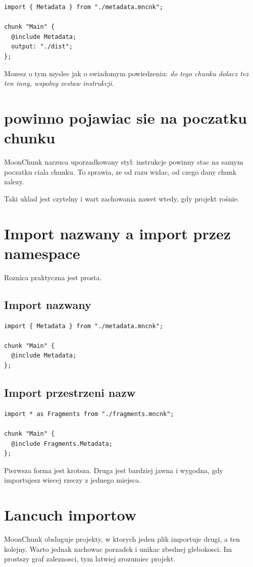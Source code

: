 \begin{lstlisting}[style=moonchunk,caption={Dolaczenie wspolnego chunku}]
import { Metadata } from "./metadata.mncnk";

chunk "Main" {
  @include Metadata;
  output: "./dist";
};
\end{lstlisting}

Mozesz o tym myslec jak o swiadomym powiedzeniu: \emph{do tego chunku dolacz tez ten
inny, wspolny zestaw instrukcji}.

\section{ powinno pojawiac sie na poczatku chunku}
MoonChunk narzuca uporzadkowany styl: instrukcje  powinny stac na samym
poczatku ciala chunku. To sprawia, ze od razu widac, od czego dany chunk zalezy.

Taki uklad jest czytelny i wart zachowania nawet wtedy, gdy projekt rośnie.

\section{Import nazwany a import przez namespace}
Roznica praktyczna jest prosta.

\subsection*{Import nazwany}
\begin{lstlisting}[style=moonchunk,caption={Uzycie importu nazwanego}]
import { Metadata } from "./metadata.mncnk";

chunk "Main" {
  @include Metadata;
};
\end{lstlisting}

\subsection*{Import przestrzeni nazw}
\begin{lstlisting}[style=moonchunk,caption={Uzycie importu namespace}]
import * as Fragments from "./fragments.mncnk";

chunk "Main" {
  @include Fragments.Metadata;
};
\end{lstlisting}

Pierwsza forma jest krotsza. Druga jest bardziej jawna i wygodna, gdy importujesz
wiecej rzeczy z jednego miejsca.

\section{Lancuch importow}
MoonChunk obsluguje projekty, w ktorych jeden plik importuje drugi, a ten kolejny.
Warto jednak zachowac porzadek i unikac zbednej glebokosci. Im prostszy graf zaleznosci,
tym latwiej zrozumiec projekt.

